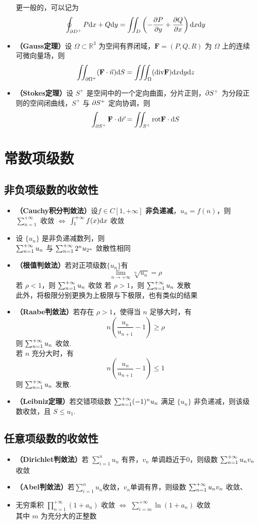 \documentclass[./main.tex]{subfiles}
\begin{document}
\begin{itemize}
\begin{itemize}
  \end{itemize}
  更一般的，可以记为
  $$ \oint_{\partial D^+}P\text{d}x+Q\text{d}y=\iint_{D}\left(-\frac{\partial P}{\partial y}+\frac{\partial Q}{\partial x}\right)\text{d}x\text{d}y $$
    \item \textbf{（Gauss定理）}设 $\Omega\subset\mathbb{R}^3$ 为空间有界闭域，$\mathbf{F}=(P,Q,R)$ 为 $\Omega$ 上的连续可微向量场，则
  $$\iint_{\partial\Omega^+}(\mathbf{F}\cdot\vec{n})\text{d}S=\iiint_\Omega(\text{div}\mathbf{F})\text{d}x\text{d}y\text{d}z$$
  \item \textbf{（Stokes定理）}设 $S^+$ 是空间中的一个定向曲面，分片正则，$\partial S^+$ 为分段正则的空间闭曲线，$S^+$ 与 $\partial S^+$ 定向协调，则
  $$\int_{\partial S^+}\mathbf{F}\cdot\text{d}\vec{r}=\iint_{S^+}\text{rot}\mathbf{F}\cdot\text{d}S$$
\end{itemize}

\section{常数项级数}
\subsection{非负项级数的收敛性}
\begin{itemize}
  \item \textbf{（Cauchy积分判敛法）}设$ f\in C[1,+\infty]$ \textbf{非负递减}，$u_n=f(n)$，则\\$\sum_{n=1}^{+\infty}$ 收敛 $\iff$ $\int_{1}^{+\infty}f(x)\text{d}x$ 收敛
  \item 设 $\{u_n\}$ 是非负递减数列，则\\
  $\sum_{n=1}^{+\infty}u_n$ 与 $\sum_{n=1}^{+\infty}2^nu_{2^n}$ 敛散性相同
  \item \textbf{（根值判敛法）}若对正项级数$\{u_n\}$有 $$\lim\limits_{n\rightarrow+\infty}\sqrt[n]{u_n}=\rho$$
  \subitem 若 $\rho<1$，则 $\sum_{n=1}^{+\infty}u_n$ 收敛
  \subitem 若 $\rho>1$，则 $\sum_{n=1}^{+\infty}u_n$ 发散\\
  此外，将极限分别更换为上极限与下极限，也有类似的结果
  \item \textbf{（Raabe判敛法）}若存在 $\rho>1$，使得当 $n$ 足够大时，有 $$n\left(\frac{u_n}{u_{n+1}}-1\right)\ge\rho$$ 则 $\sum_{n=1}^{+\infty}u_n$ 收敛.\\
  若 $n$ 充分大时，有 $$n\left(\frac{u_n}{u_{n+1}}-1\right)\le1$$ 则 $\sum_{n=1}^{+\infty}u_n$ 发散.
  \item \textbf{（Leibniz定理）}若交错项级数 $\sum_{n=1}^{+\infty}(-1)^nu_n$ 满足 $\{u_n\}$ 非负递减，则该级数收敛，且 $S\le u_1$.
\end{itemize}
\subsection{任意项级数的收敛性}
\begin{itemize}
  \item \textbf{（Dirichlet判敛法）}若 $\sum_{i=1}^nu_n$ 有界，$v_n$ 单调趋近于0，则级数 $\sum_{n=1}^{+\infty}u_nv_n$ 收敛
  \item \textbf{（Abel判敛法）}若$\sum_{i=1}^nu_n$收敛，$v_n$单调有界，则级数 $\sum_{n=1}^{+\infty}u_nv_n$ 收敛、
  \item 无穷乘积 $\prod_{n=1}^{+\infty}(1+a_n)$ 收敛 $\iff$  $\sum_{i=m}^{+\infty}\ln(1+a_n)$ 收敛\\
  其中 $m$ 为充分大的正整数
\end{itemize}
\end{document}
